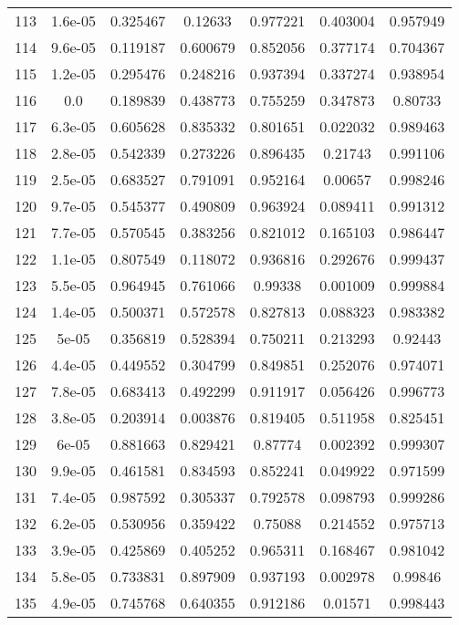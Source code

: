 \begin{table}
\begin{tabular}{c|c|c|c|c|c|c}
113 & 1.6e-05 & 0.325467 & 0.12633 & 0.977221 & 0.403004 & 0.957949\\
114 & 9.6e-05 & 0.119187 & 0.600679 & 0.852056 & 0.377174 & 0.704367\\
115 & 1.2e-05 & 0.295476 & 0.248216 & 0.937394 & 0.337274 & 0.938954\\
116 & 0.0 & 0.189839 & 0.438773 & 0.755259 & 0.347873 & 0.80733\\
117 & 6.3e-05 & 0.605628 & 0.835332 & 0.801651 & 0.022032 & 0.989463\\
118 & 2.8e-05 & 0.542339 & 0.273226 & 0.896435 & 0.21743 & 0.991106\\
119 & 2.5e-05 & 0.683527 & 0.791091 & 0.952164 & 0.00657 & 0.998246\\
120 & 9.7e-05 & 0.545377 & 0.490809 & 0.963924 & 0.089411 & 0.991312\\
121 & 7.7e-05 & 0.570545 & 0.383256 & 0.821012 & 0.165103 & 0.986447\\
122 & 1.1e-05 & 0.807549 & 0.118072 & 0.936816 & 0.292676 & 0.999437\\
123 & 5.5e-05 & 0.964945 & 0.761066 & 0.99338 & 0.001009 & 0.999884\\
124 & 1.4e-05 & 0.500371 & 0.572578 & 0.827813 & 0.088323 & 0.983382\\
125 & 5e-05 & 0.356819 & 0.528394 & 0.750211 & 0.213293 & 0.92443\\
126 & 4.4e-05 & 0.449552 & 0.304799 & 0.849851 & 0.252076 & 0.974071\\
127 & 7.8e-05 & 0.683413 & 0.492299 & 0.911917 & 0.056426 & 0.996773\\
128 & 3.8e-05 & 0.203914 & 0.003876 & 0.819405 & 0.511958 & 0.825451\\
129 & 6e-05 & 0.881663 & 0.829421 & 0.87774 & 0.002392 & 0.999307\\
130 & 9.9e-05 & 0.461581 & 0.834593 & 0.852241 & 0.049922 & 0.971599\\
131 & 7.4e-05 & 0.987592 & 0.305337 & 0.792578 & 0.098793 & 0.999286\\
132 & 6.2e-05 & 0.530956 & 0.359422 & 0.75088 & 0.214552 & 0.975713\\
133 & 3.9e-05 & 0.425869 & 0.405252 & 0.965311 & 0.168467 & 0.981042\\
134 & 5.8e-05 & 0.733831 & 0.897909 & 0.937193 & 0.002978 & 0.99846\\
135 & 4.9e-05 & 0.745768 & 0.640355 & 0.912186 & 0.01571 & 0.998443\\
\end{tabular}
\end{table}
